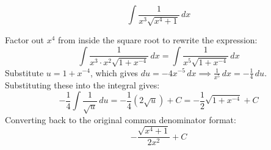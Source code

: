 \begin{questions}
    \question
    \[ \int \frac{1}{x^3 \sqrt{x^4 + 1}} \, dx \]
    \begin{solution}
        Factor out $x^4$ from inside the square root to rewrite the expression:
        \[ \int \frac{1}{x^3 \cdot x^2 \sqrt{1 + x^{-4}}} \, dx = \int \frac{1}{x^5 \sqrt{1 + x^{-4}}} \, dx \]
        Substitute $u = 1 + x^{-4}$, which gives $du = -4x^{-5} \, dx \implies \frac{1}{x^5} \, dx = -\frac{1}{4} \, du$.
        Substituting these into the integral gives:
        \[ -\frac{1}{4} \int \frac{1}{\sqrt{u}} \, du = -\frac{1}{4} \left(2\sqrt{u}\right) + C = -\frac{1}{2}\sqrt{1 + x^{-4}} + C \]
        Converting back to the original common denominator format:
        \[ -\frac{\sqrt{x^4 + 1}}{2x^2} + C \]
    \end{solution}
\end{questions}

